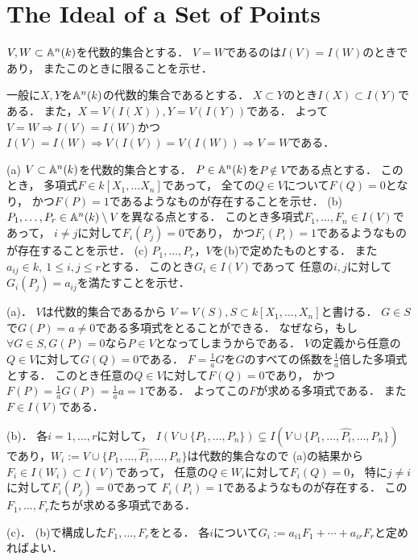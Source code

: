 \section{The Ideal of a Set of Points}

\begin{prob}
  $V,W \subset \mathbb{A}^n(k)$を代数的集合とする．
  $V = W$であるのは$I(V) = I(W)$のときであり，
  またこのときに限ることを示せ．
\end{prob}
\begin{ans}
  一般に$X,Y$を$\mathbb{A}^n(k)$の代数的集合であるとする．
  $X\subset Y$のとき$I(X) \subset I(Y)$である．
  また，$X = V(I(X)), Y = V(I(Y))$である．  
  よって$V = W \Rightarrow I(V) = I(W)$かつ
  $I(V) = I(W) \Rightarrow V(I(V)) = V(I(W)) \Rightarrow V = W$である．
\end{ans}

\begin{prob}
  (a) $V \subset \mathbb{A}^n(k)$を代数的集合とする．
  $P \in \mathbb{A}^n(k)$を$P\not\in V$である点とする．
  このとき，
  多項式$F \in k[X_1, \dots X_n] $であって，
  全ての$Q\in V$について$F(Q) = 0$となり，
  かつ$F(P) = 1$であるようなものが存在することを示せ．
  (b) $P_1,\dots, P_r \in \mathbb{A}^n(k) \setminus V$を異なる点とする．
  このとき多項式$F_1, \dots, F_n \in I(V)$であって，
  $i\ne j$に対して$F_i(P_j) = 0$であり，
  かつ$F_i(P_i) = 1$であるようなものが存在することを示せ．
  (c) $P_1,\dots, P_r$，$V$を(b)で定めたものとする．
  また$a_{ij} \in k, \ 1\le i,j \le r$とする．
  このとき$G_i \in I(V)$であって
  任意の$i,j$に対して$G_i(P_j) = a_{ij}$を満たすことを示せ．
\end{prob}
\begin{ans}
  (a)．
  $V$は代数的集合であるから
  $V = V(S), S \subset k[X_1,\dots,X_n]$と書ける．
  $G \in S$で$G(P) = a \ne 0$である多項式をとることができる．
  なぜなら，もし$\forall G \in S, G(P) = 0$なら$P\in V$となってしまうからである．
  $V$の定義から任意の$Q\in V$に対して$G(Q) = 0$である．
  $F = \frac{1}{a} G$を$G$のすべての係数を$\frac{1}{a}$倍した多項式とする．
  このとき任意の$Q \in V$に対して$F(Q) = 0$であり，
  かつ$F(P) = \frac{1}{a}G(P) = \frac{1}{a} a = 1$である．
  よってこの$F$が求める多項式である．
  また$F \in I(V)$である．

  (b)．
  各$i=1,\dots, r$に対して，
  $I( V \cup \{ P_1 , \dots , P_n \} ) \subsetneq I( V \cup \{ P_1 , \dots , \hat{P_i}, \dots , P_n \})$
  であり，$W_i := V \cup \{ P_1 , \dots , \hat{P_i}, \dots , P_n \}$は代数的集合なので
  (a)の結果から$F_i \in I(W_i) \subset I(V)$であって，
  任意の$Q\in W_i$に対して$F_i(Q) = 0$，
  特に$j \ne i$に対して$F_i(P_j) = 0$であって
  $F_i(P_i) = 1$であるようなものが存在する．
  この$F_1, \dots, F_r$たちが求める多項式である．
  
  (c)．
  (b)で構成した$F_1, \dots, F_r$をとる．
  各$i$について$G_i := a_{i1} F_1 + \cdots + a_{ir} F_r$と定めればよい．
\end{ans}

